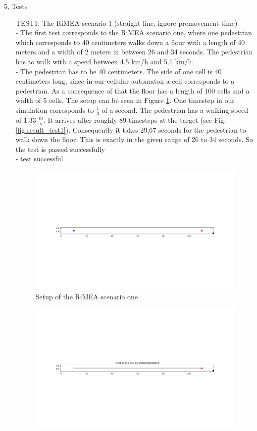 \documentclass[10pt,a4paper]{article}
\begin{document}
\begin{task}{5, Tests}
\begin{enumerate}
\item[TEST1:] The RiMEA scenario 1 (straight line, ignore premovement time)\\
- The first test corresponds to the RiMEA scenario one, where one pedestrian which corresponds to 40 centimeters walks down a floor with a length of 40 meters and a width of 2 meters in between 26 and 34 seconds. The pedestrian has to walk with a speed between 4.5 km/h and 5.1 km/h. \\
- The pedestrian has to be 40 centimeters. The side of one cell is 40 centimeters long, since in our cellular automaton a cell corresponds to a pedestrian. As a consequence of that the floor has a length of 100 cells and a width of 5 cells. The setup can be seen in Figure \ref{fig:setup_test1}. One timestep in our simulation corresponds to $\frac{1}{3}$ of a second. The pedestrian has a walking speed of 1.33 $\frac{m}{s}$. It arrives after roughly 89 timesteps at the target (see Fig. \ref{fig:result_test1}). Consequently it takes 29,67 seconds for the pedestrian to walk down the floor. This is exactly in the given range of 26 to 34 seconds. So the test is passed successfully \\
- test successful
\begin{figure}
    \centering
    \includegraphics[width=\textwidth]{pictures/Test1start.png}
    \caption{Setup of the RiMEA scenario one}
    \label{fig:setup_test1}
\end{figure}
\begin{figure}
    \centering
    \includegraphics[width=\textwidth]{pictures/Test1.png}

\end{figure}
\end{enumerate}
\end{task}
\end{document}
